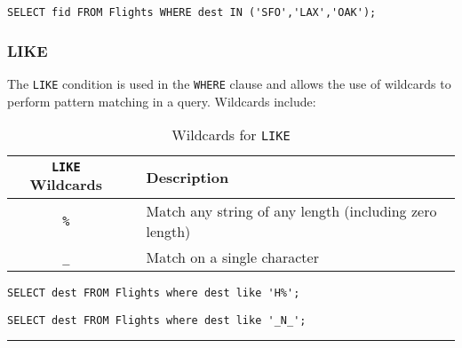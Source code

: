 \documentclass{article}
\begin{document}
\begin{lstlisting}[frame=single]  
SELECT fid FROM Flights WHERE dest IN ('SFO','LAX','OAK');
\end{lstlisting} 



\subsubsection*{LIKE}
The \texttt{LIKE} condition is used in the \texttt{WHERE} clause and allows the use of wildcards to perform pattern matching in a query.  Wildcards include: 


 
 \begin{table}
  \centering
    \begin{tabular}{cll}
     \hline
   \textbf{\texttt{LIKE }Wildcards} & & \textbf{Description} \\ 
    \hline
        \texttt{\%} & &  Match any string of any length (including zero length)  \\
         \texttt{\_} & & Match on a single character \\

    \hline 
    \end{tabular}
    \caption{Wildcards for \texttt{LIKE}}
 \end{table} 






\begin{lstlisting}[frame=single]  
SELECT dest FROM Flights where dest like 'H%';
\end{lstlisting} 


\begin{lstlisting}[frame=single]  
SELECT dest FROM Flights where dest like '_N_';
\end{lstlisting} 



\hspace{-0.5cm}\rule[0.101in]{\textwidth}{0.0025in}
\end{document}

